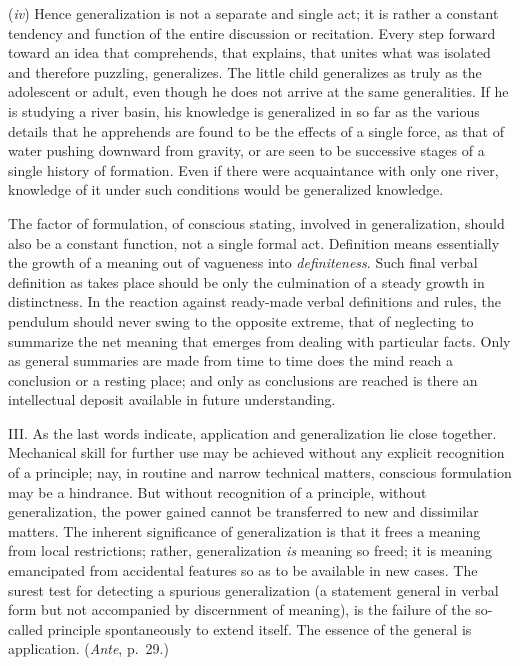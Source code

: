 \documentclass[letterpaper]{book}
\begin{document}
(\emph{iv}) Hence generalization is not a separate and single act; it is
rather a constant tendency and function of the entire discussion or
recitation. Every step forward toward an idea that comprehends, that
explains, that unites what was isolated and therefore puzzling,
generalizes. The little child generalizes as truly as the adolescent or
adult, even though he does not arrive at the same generalities. If he is
studying a river basin, his knowledge is generalized in so far as the
various details that he apprehends are found to be the effects of a
single force, as that of water pushing downward from gravity, or are
seen to be successive stages of a single history of formation. Even if
there were acquaintance with only one river, knowledge of it under such
conditions would be generalized
knowledge.


The factor of formulation, of conscious stating, involved in
generalization, should also be a constant function, not a single formal
act. Definition means essentially the growth of a meaning out of
vagueness into \emph{definiteness}. Such final verbal definition as
takes place should be only the culmination of a steady growth in
distinctness. In the reaction against ready-made verbal definitions and
rules, the pendulum should never swing to the opposite extreme, that of
neglecting to summarize the net meaning that emerges from dealing with
particular facts. Only as general summaries are made from time to time
does the mind reach a conclusion or a resting place; and only as
conclusions are reached is there an intellectual deposit available in
future understanding.


III. As the last words indicate, application and generalization lie
close together. Mechanical skill for further use may be achieved without
any explicit recognition of a principle; nay, in routine and narrow
technical matters, conscious formulation may be a hindrance. But without
recognition of a principle, without generalization, the power gained
cannot be transferred to new and dissimilar matters. The inherent
significance of generalization is that it frees a meaning from local
restrictions; rather, generalization \emph{is} meaning so freed; it is
meaning emancipated from accidental features so as to be available in
new cases. The surest test for detecting a spurious generalization (a
statement general in verbal form but not accompanied by discernment of
meaning), is the failure of the so-called principle spontaneously to
extend itself. The essence of the general is application. (\emph{Ante},
p.\ 29.)
\end{document}
